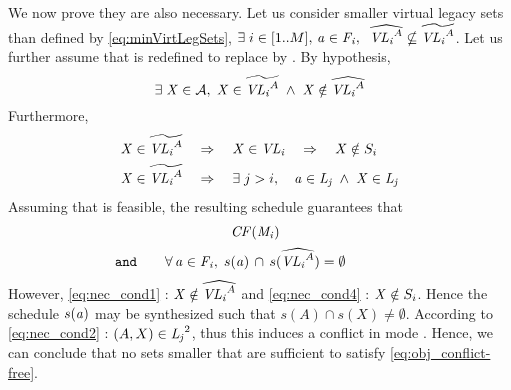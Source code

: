\squarepar{%
	By hypothesis, \sched{\mode{b}} is feasible, thus $s(\appB) \; \cap \; s(\minvirtlegApp{b}{B}) = \emptyset$, which yields $s(B) \cap s(A) = \emptyset$ and contradicts \eqref{eq:square} again.
	Therefore, the recurrence hypothesis is necessarily false.
	Hence, if for any $k \in [1 .. i]$, \sched{\mode{k}} is feasible in the sense of \eqref{eq:sched_redef}, then \cf{\legApp{i+1}}.
	By recurrence, we can conclude that the \emph{virtual legacy sets as defined by \eqref{eq:minVirtLegSets} are sufficient} to satisfy \eqref{eq:obj_conflict-free}.%
}

We now prove they are also necessary.
Let us consider smaller virtual legacy sets than defined by \eqref{eq:minVirtLegSets}, \ie $\exists \; i \in [1..M],\, \mathit{a_{}} \in \mathit{F_{i}}, \;\;\widehat{\mathit{VL_{i}}^{A}} \nsubseteq \widetilde{\mathit{VL_{i}}^{A}}$. Let us further assume that \sched{} is redefined to replace \minvirtlegApp{}{} by \minminvirtlegApp{}{}. By hypothesis,
\begin{equation}
\label{eq:nec_cond1}
\exists \; \mathit{X} \in \mathcal{A}, \; \mathit{X} \in \widetilde{\mathit{VL_{i}}^{A}}\; \wedge \; {\mathit{X} \notin \widehat{\mathit{VL_{i}}^{A}}}
\end{equation}
Furthermore,
\begin{align}
\label{eq:nec_cond4}
\appX \in \minvirtlegApp{i}{A}
	&\quad \Rightarrow \quad
	\appX \in \virtlegApp{i} \quad \Rightarrow \quad {\appX \notin S_{i}}\\
\label{eq:nec_cond2}
\appX \in \minvirtlegApp{i}{A}
	&\quad \Rightarrow \quad
	\exists \; j>i, \quad {\app \in \legApp{j}} \; \wedge \; \appX \in \legApp{j}
\end{align}
Assuming that \sched{\modei} is feasible, the resulting schedule guarantees that
\begin{equation}
\label{eq:nec_cond5}
\begin{tabular}{l@{\quad\quad}cp{30pt}}
	&
	\cf{\modei}
	&\\[5pt]
\texttt{and}
	&
	$\forall \, \app \in \freeApp{i},\; s(\app) \, \cap \, s(\minminvirtlegApp{i}{A}) = \emptyset$
	&
\end{tabular}
\end{equation}
However, \eqref{eq:nec_cond1} : $\mathit{X} \notin \widehat{\mathit{VL_{i}}^{A}}$ and \eqref{eq:nec_cond4} : $\mathit{X} \notin S_{i}$. Hence the schedule $s(\mathit{a_{}})$ may be synthesized such that $s(A) \cap s(X) \not= \emptyset$. According to \eqref{eq:nec_cond2} : $(A,X) \in \mathit{L_{j}}^2$, thus this induces a conflict in mode \modej.
Hence, we can conclude that no sets \minminvirtlegApp{}{} smaller that \minvirtlegApp{}{} are sufficient to satisfy \eqref{eq:obj_conflict-free}.


